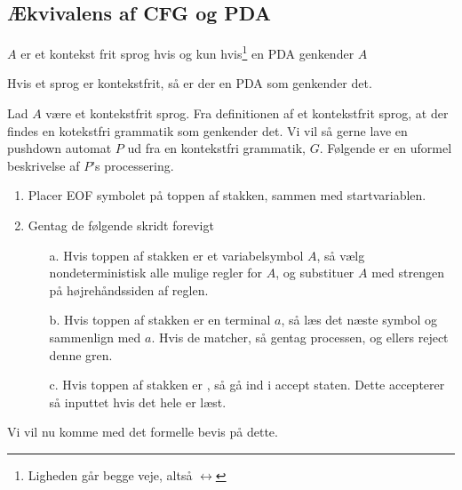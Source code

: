\subsection{Ækvivalens af CFG og PDA}%
\label{subsec:cfgpdaequiv}

\begin{theorem}
	\label{teo:cfgpdaquiv}
	$A$ er et kontekst frit sprog hvis og kun hvis\footnote{Ligheden går begge veje, altså $\leftrightarrow$} en PDA genkender $A$
\end{theorem}

\begin{lemma}
	Hvis et sprog er kontekstfrit, så er der en PDA som genkender det.
\end{lemma}

Lad $A$ være et kontekstfrit sprog. Fra definitionen af et kontekstfrit sprog, at der findes en kotekstfri grammatik som genkender det. Vi vil så gerne lave en pushdown automat $P$ ud fra en kontekstfri grammatik, $G$. Følgende er en uformel beskrivelse af $P$'s processering.
\begin{enumerate}
	\item Placer EOF symbolet \textdollar på toppen af stakken, sammen med startvariablen.
	\item Gentag de følgende skridt forevigt
	      \begin{enumerate}
		      \item[a.] Hvis toppen af stakken er et variabelsymbol $A$, så vælg nondeterministisk alle mulige regler for $A$, og substituer $A$ med strengen på højrehåndssiden af reglen.
		      \item[b.] Hvis toppen af stakken er en terminal $a$, så læs det næste symbol og sammenlign med $a$. Hvis de matcher, så gentag processen, og ellers reject denne gren.
		      \item[c.] Hvis toppen af stakken er \textdollar, så gå ind i accept staten. Dette accepterer så inputtet hvis det hele er læst.
	      \end{enumerate}
\end{enumerate}

Vi vil nu komme med det formelle bevis på dette.

